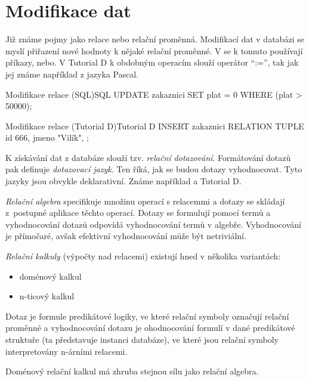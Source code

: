 \section{Modifikace dat}
Již známe pojmy jako relace nebo relační proměnná. Modifikací dat v databázi se myslí přiřazení nové hodnoty k nějaké relační proměnné. V  se k tomuto používají příkazy, nebo. V Tutorial D k obdobným operacím slouží operátor \enquote{:=}, tak jak jej známe například z jazyka Pascal.
\begin{upcode}{Modifikace relace (SQL)}{}{SQL}
UPDATE	zakaznici
SET		plat = 0
WHERE	(plat > 50000);
\end{upcode}
\begin{upcode}{Modifikace relace (Tutorial D)}{}{Tutorial D}
INSERT zakaznici RELATION {TUPLE {id 666, jmeno "Vilík", }};
\end{upcode}
K získávání dat z databáze slouží tzv. \textit{relační dotazování}. Formátování dotazů pak definuje \textit{dotazovací jazyk}. Ten říká, jak se budou dotazy vyhodnocovat. Tyto jazyky jsou obvykle deklarativní. Známe například  a Tutorial D.

\textit{Relační algebra} specifikuje množinu operací s relacemmi a dotazy se skládají z~postupné aplikace těchto operací. Dotazy se formulují pomocí termů a vyhodnocování dotazů odpovídá vyhodnocování termů v algebře. Vyhodnocování je přímočaré, avšak efektivní vyhodnocování může být netriviální.

\textit{Relační kalkuly} (výpočty nad relacemi) existují hned v několika variantách:
\begin{itemize}
\item doménový kalkul
\item n-ticový kalkul
\end{itemize}
Dotaz je formule predikátové logiky, ve které relační symboly označují relační proměnné a vyhodnocování dotazu je ohodnocování formulí v dané predikátové struktuře (ta představuje instanci databáze), ve které jsou relační symboly interpretovány n-árními relacemi.

Doménový relační kalkul má zhruba stejnou sílu jako relační algebra.

